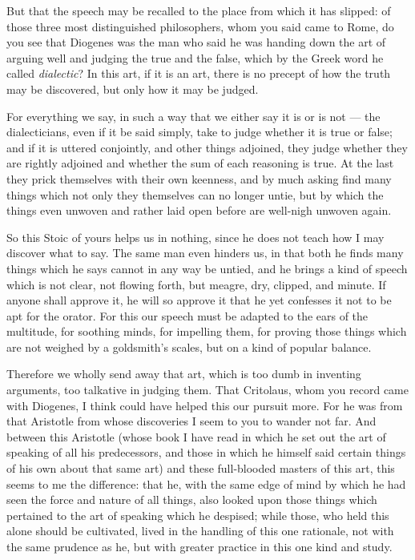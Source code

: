  But that the speech may be recalled to the place from which it has slipped: of those three most distinguished philosophers, whom you said came to Rome, do you see that Diogenes was the man who said he was handing down the art of arguing well and judging the true and the false, which by the Greek word he called \textit{dialectic}? In this art, if it is an art, there is no precept of how the truth may be discovered, but only how it may be judged.

 For everything we say, in such a way that we either say it is or is not — the dialecticians, even if it be said simply, take to judge whether it is true or false; and if it is uttered conjointly, and other things adjoined, they judge whether they are rightly adjoined and whether the sum of each reasoning is true. At the last they prick themselves with their own keenness, and by much asking find many things which not only they themselves can no longer untie, but by which the things even unwoven and rather laid open before are well-nigh unwoven again.

 So this Stoic of yours helps us in nothing, since he does not teach how I may discover what to say. The same man even hinders us, in that both he finds many things which he says cannot in any way be untied, and he brings a kind of speech which is not clear, not flowing forth, but meagre, dry, clipped, and minute. If anyone shall approve it, he will so approve it that he yet confesses it not to be apt for the orator. For this our speech must be adapted to the ears of the multitude, for soothing minds, for impelling them, for proving those things which are not weighed by a goldsmith's scales, but on a kind of popular balance.

 Therefore we wholly send away that art, which is too dumb in inventing arguments, too talkative in judging them. That Critolaus, whom you record came with Diogenes, I think could have helped this our pursuit more. For he was from that Aristotle from whose discoveries I seem to you to wander not far. And between this Aristotle (whose book I have read in which he set out the art of speaking of all his predecessors, and those in which he himself said certain things of his own about that same art) and these full-blooded masters of this art, this seems to me the difference: that he, with the same edge of mind by which he had seen the force and nature of all things, also looked upon those things which pertained to the art of speaking which he despised; while those, who held this alone should be cultivated, lived in the handling of this one rationale, not with the same prudence as he, but with greater practice in this one kind and study.

